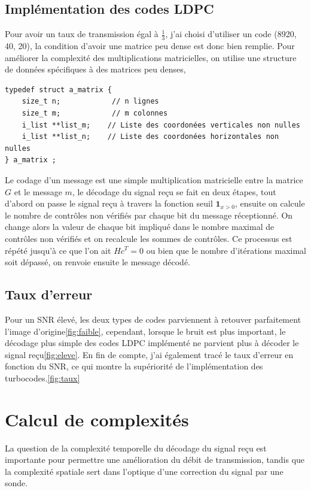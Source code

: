 \documentclass[12pt]{article}
\begin{document}
\subsection{Impl\'ementation des codes LDPC}
Pour avoir un taux de transmission \'egal \`a $\frac{1}{3}$, j'ai choisi d'utiliser un code (8920, 40, 20), la condition d'avoir une matrice peu dense est donc bien remplie.
Pour am\'eliorer la complexit\'e des multiplications matricielles, on utilise une structure de donn\'ees sp\'ecifiques \`a des matrices peu denses,
\footnotesize
\begin{verbatim}
typedef struct a_matrix {
	size_t n;            // n lignes
	size_t m;            // m colonnes
	i_list **list_m;    // Liste des coordonées verticales non nulles
	i_list **list_n;    // Liste des coordonées horizontales non nulles
} a_matrix ;
\end{verbatim}
\normalsize
Le codage d'un message est une simple multiplication matricielle entre la matrice $G$ et le message $m$, le d\'ecodage du signal re\c{c}u se fait en deux \'etapes, tout d'abord on passe le signal re\c{c}u \`a travers la fonction seuil $\mathbf{1}_{x>0}$, ensuite on calcule le nombre de contr\^oles non v\'erifi\'es par chaque bit du message r\'eceptionn\'e. On change alors la valeur de chaque bit impliqu\'e dans le nombre maximal de contr\^oles non v\'erifi\'es et on recalcule les sommes de contr\^oles. Ce processus est r\'ep\'et\'e jusqu'\`a ce que l'on ait $Hc^T=0$ ou bien que le nombre d'it\'erations maximal soit d\'epass\'e, on renvoie ensuite le message d\'ecod\'e.

\subsection{Taux d'erreur}
Pour un SNR \'elev\'e, les deux types de codes parviennent \`a retouver parfaitement l'image d'origine\ref{fig:faible}, cependant, lorsque le bruit est plus important, le d\'ecodage plus simple des codes LDPC impl\'ement\'e ne parvient plus \`a d\'ecoder le signal re\c{c}u\ref{fig:eleve}. En fin de compte, j'ai \'egalement trac\'e le taux d'erreur en fonction du SNR, ce qui montre la sup\'eriorit\'e de l'impl\'ementation des turbocodes.\ref{fig:taux}

\section{Calcul de complexit\'es}
La question de la complexit\'e temporelle du d\'ecodage du signal re\c{c}u est importante pour permettre une am\'elioration du d\'ebit de transmission, tandis que la complexit\'e spatiale sert dans l'optique d'une correction du signal par une sonde.
\end{document}
